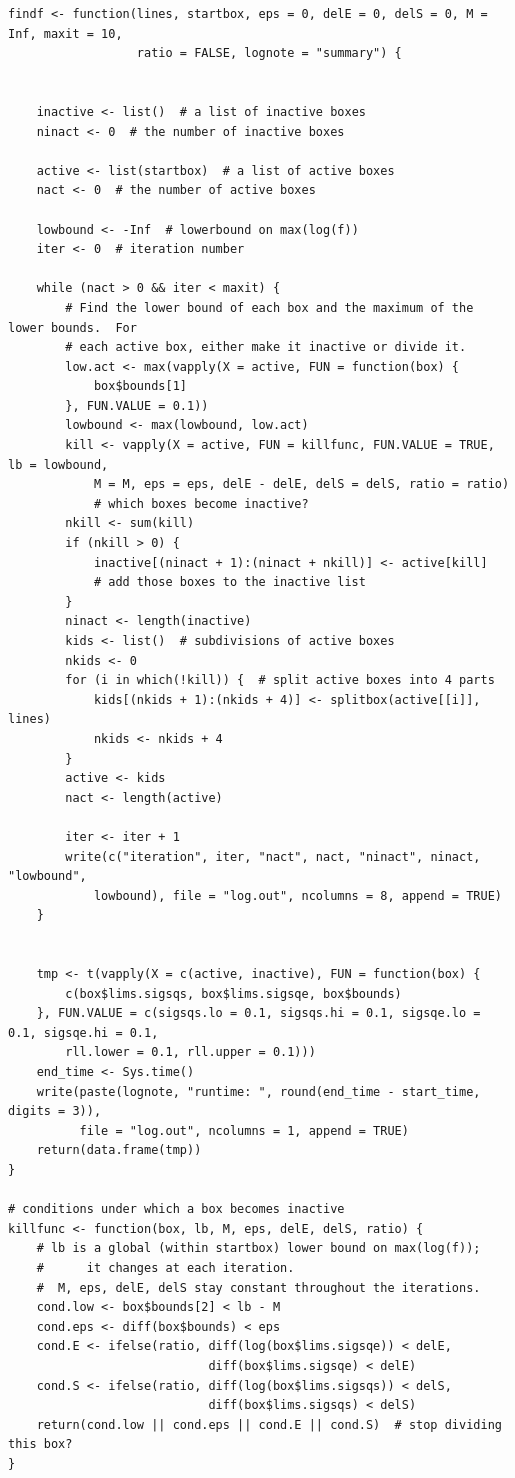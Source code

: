 \documentclass{report}
\begin{document}
\begin{verbatim}
findf <- function(lines, startbox, eps = 0, delE = 0, delS = 0, M = Inf, maxit = 10,
                  ratio = FALSE, lognote = "summary") {


    inactive <- list()  # a list of inactive boxes
    ninact <- 0  # the number of inactive boxes
    
    active <- list(startbox)  # a list of active boxes
    nact <- 0  # the number of active boxes

    lowbound <- -Inf  # lowerbound on max(log(f))
    iter <- 0  # iteration number

    while (nact > 0 && iter < maxit) {
        # Find the lower bound of each box and the maximum of the lower bounds.  For
        # each active box, either make it inactive or divide it.
        low.act <- max(vapply(X = active, FUN = function(box) {
            box$bounds[1]
        }, FUN.VALUE = 0.1))
        lowbound <- max(lowbound, low.act)
        kill <- vapply(X = active, FUN = killfunc, FUN.VALUE = TRUE, lb = lowbound,
            M = M, eps = eps, delE - delE, delS = delS, ratio = ratio)
            # which boxes become inactive?
        nkill <- sum(kill)
        if (nkill > 0) {
            inactive[(ninact + 1):(ninact + nkill)] <- active[kill] 
            # add those boxes to the inactive list
        }
        ninact <- length(inactive)
        kids <- list()  # subdivisions of active boxes
        nkids <- 0
        for (i in which(!kill)) {  # split active boxes into 4 parts
            kids[(nkids + 1):(nkids + 4)] <- splitbox(active[[i]], lines)
            nkids <- nkids + 4
        }
        active <- kids
        nact <- length(active)

        iter <- iter + 1
        write(c("iteration", iter, "nact", nact, "ninact", ninact, "lowbound",
            lowbound), file = "log.out", ncolumns = 8, append = TRUE)
    }


    tmp <- t(vapply(X = c(active, inactive), FUN = function(box) {
        c(box$lims.sigsqs, box$lims.sigsqe, box$bounds)
    }, FUN.VALUE = c(sigsqs.lo = 0.1, sigsqs.hi = 0.1, sigsqe.lo = 0.1, sigsqe.hi = 0.1,
        rll.lower = 0.1, rll.upper = 0.1)))
    end_time <- Sys.time()
    write(paste(lognote, "runtime: ", round(end_time - start_time, digits = 3)),
          file = "log.out", ncolumns = 1, append = TRUE)
    return(data.frame(tmp))
}

# conditions under which a box becomes inactive
killfunc <- function(box, lb, M, eps, delE, delS, ratio) {
    # lb is a global (within startbox) lower bound on max(log(f));
    #      it changes at each iteration.
    #  M, eps, delE, delS stay constant throughout the iterations.
    cond.low <- box$bounds[2] < lb - M
    cond.eps <- diff(box$bounds) < eps
    cond.E <- ifelse(ratio, diff(log(box$lims.sigsqe)) < delE,
                            diff(box$lims.sigsqe) < delE)
    cond.S <- ifelse(ratio, diff(log(box$lims.sigsqs)) < delS,
                            diff(box$lims.sigsqs) < delS)
    return(cond.low || cond.eps || cond.E || cond.S)  # stop dividing this box?
}
\end{verbatim}



\end{document}
